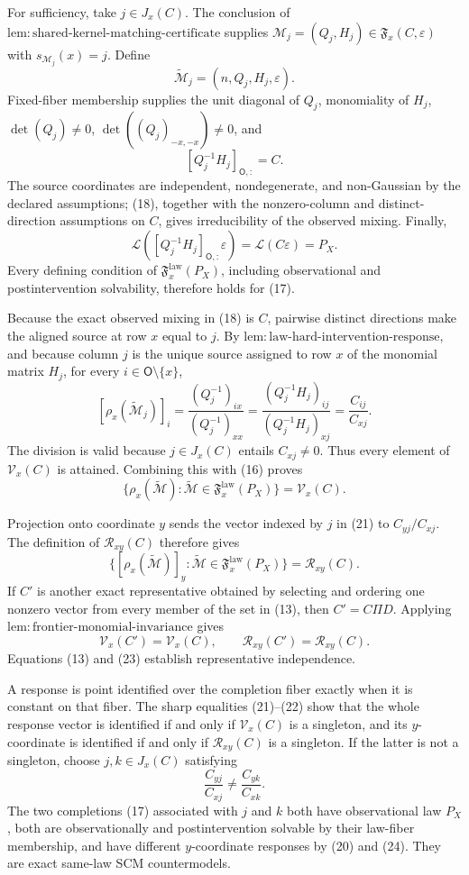For sufficiency, take \(j\in J_x(C)\). The conclusion of \(\mathrm{lem:shared\text{-}kernel\text{-}matching\text{-}certificate}\) supplies \(\mathcal M_j=(Q_j,H_j)\in\mathfrak F_x(C,\varepsilon)\) with \(s_{\mathcal M_j}(x)=j\). Define
\[
 \widetilde{\mathcal M}_j=(n,Q_j,H_j,\varepsilon). \tag{17}
\]
Fixed-fiber membership supplies the unit diagonal of \(Q_j\), monomiality of \(H_j\), \(\det(Q_j)\ne0\), \(\det((Q_j)_{-x,-x})\ne0\), and
\[
 [Q_j^{-1}H_j]_{\mathsf O,:}=C. \tag{18}
\]
The source coordinates are independent, nondegenerate, and non-Gaussian by the declared assumptions; (18), together with the nonzero-column and distinct-direction assumptions on \(C\), gives irreducibility of the observed mixing. Finally,
\[
 \mathcal L([Q_j^{-1}H_j]_{\mathsf O,:}\varepsilon)
 =\mathcal L(C\varepsilon)=P_X. \tag{19}
\]
Every defining condition of \(\mathfrak F_x^{\mathrm{law}}(P_X)\), including observational and postintervention solvability, therefore holds for (17).

Because the exact observed mixing in (18) is \(C\), pairwise distinct directions make the aligned source at row \(x\) equal to \(j\). By \(\mathrm{lem:law\text{-}hard\text{-}intervention\text{-}response}\), and because column \(j\) is the unique source assigned to row \(x\) of the monomial matrix \(H_j\), for every \(i\in\mathsf O\setminus\{x\}\),
\[
 [\rho_x(\widetilde{\mathcal M}_j)]_i
 =\frac{(Q_j^{-1})_{ix}}{(Q_j^{-1})_{xx}}
 =\frac{(Q_j^{-1}H_j)_{ij}}{(Q_j^{-1}H_j)_{xj}}
 =\frac{C_{ij}}{C_{xj}}. \tag{20}
\]
The division is valid because \(j\in J_x(C)\) entails \(C_{xj}\ne0\). Thus every element of \(\mathcal V_x(C)\) is attained. Combining this with (16) proves
\[
 \{\rho_x(\widetilde{\mathcal M}):\widetilde{\mathcal M}\in\mathfrak F_x^{\mathrm{law}}(P_X)\}
 =\mathcal V_x(C). \tag{21}
\]

Projection onto coordinate \(y\) sends the vector indexed by \(j\) in (21) to \(C_{yj}/C_{xj}\). The definition of \(\mathcal R_{xy}(C)\) therefore gives
\[
 \{[\rho_x(\widetilde{\mathcal M})]_y:\widetilde{\mathcal M}\in\mathfrak F_x^{\mathrm{law}}(P_X)\}
 =\mathcal R_{xy}(C). \tag{22}
\]
If \(C'\) is another exact representative obtained by selecting and ordering one nonzero vector from every member of the set in (13), then \(C'=C\Pi D\). Applying \(\mathrm{lem:frontier\text{-}monomial\text{-}invariance}\) gives
\[
 \mathcal V_x(C')=\mathcal V_x(C),
 \qquad
 \mathcal R_{xy}(C')=\mathcal R_{xy}(C). \tag{23}
\]
Equations (13) and (23) establish representative independence.

A response is point identified over the completion fiber exactly when it is constant on that fiber. The sharp equalities (21)--(22) show that the whole response vector is identified if and only if \(\mathcal V_x(C)\) is a singleton, and its \(y\)-coordinate is identified if and only if \(\mathcal R_{xy}(C)\) is a singleton. If the latter is not a singleton, choose \(j,k\in J_x(C)\) satisfying
\[
 \frac{C_{yj}}{C_{xj}}\ne\frac{C_{yk}}{C_{xk}}. \tag{24}
\]
The two completions (17) associated with \(j\) and \(k\) both have observational law \(P_X\), both are observationally and postintervention solvable by their law-fiber membership, and have different \(y\)-coordinate responses by (20) and (24). They are exact same-law SCM countermodels.

